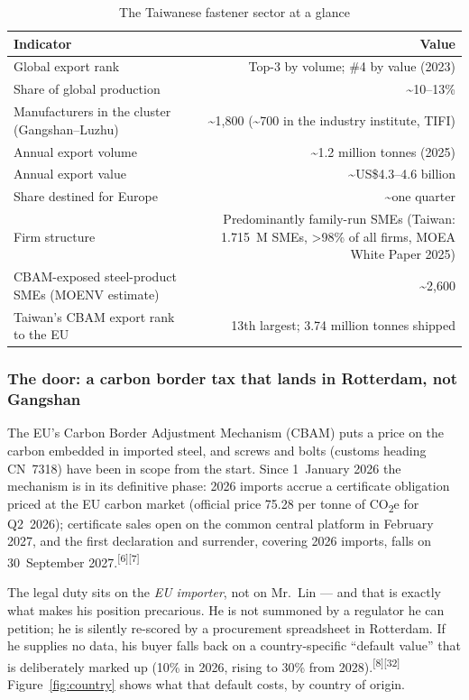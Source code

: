 \documentclass[11pt]{article}
\newcommand{\euro}{\texteuro}
\begin{document}
\begin{table}[h]
\caption{The Taiwanese fastener sector at a glance}
\label{tab:sector}
\small
\begin{tabularx}{\textwidth}{Y r}
\toprule
\textbf{Indicator} & \textbf{Value} \\
\midrule
Global export rank & Top-3 by volume; \#4 by value (2023) \\
Share of global production & \textasciitilde10--13\% \\
Manufacturers in the cluster (Gangshan--Luzhu) & \textasciitilde1{,}800 (\textasciitilde700 in the industry institute, TIFI) \\
Annual export volume & \textasciitilde1.2 million tonnes (2025) \\
Annual export value & \textasciitilde US\$4.3--4.6 billion \\
Share destined for Europe & \textasciitilde one quarter \\
Firm structure & Predominantly family-run SMEs (Taiwan: 1.715~M SMEs, >98\% of all firms, MOEA White Paper 2025) \\
CBAM-exposed steel-product SMEs (MOENV estimate) & \textasciitilde2{,}600 \\
Taiwan's CBAM export rank to the EU & 13th largest; 3.74 million tonnes shipped \\
\bottomrule
\end{tabularx}
\end{table}

\subsubsection{The door: a carbon border tax that lands in Rotterdam, not Gangshan}
The EU's Carbon Border Adjustment Mechanism (CBAM) puts a price on the carbon embedded in imported steel, and screws and bolts (customs heading CN~7318) have been in scope from the start. Since 1~January 2026 the mechanism is in its definitive phase: 2026 imports accrue a certificate obligation priced at the EU carbon market (official price \euro{}75.28 per tonne of CO\textsubscript{2}e for Q2~2026); certificate sales open on the common central platform in February 2027, and the first declaration and surrender, covering 2026 imports, falls on 30~September 2027.\textsuperscript{[6][7]}

The legal duty sits on the \emph{EU importer}, not on Mr.\ Lin --- and that is exactly what makes his position precarious. He is not summoned by a regulator he can petition; he is silently re-scored by a procurement spreadsheet in Rotterdam. If he supplies no data, his buyer falls back on a country-specific ``default value'' that is deliberately marked up (10\% in 2026, rising to 30\% from 2028).\textsuperscript{[8][32]} Figure~\ref{fig:country} shows what that default costs, by country of origin.
\end{document}
